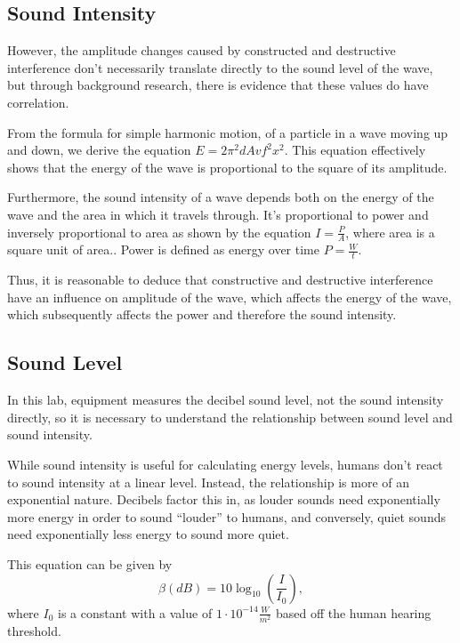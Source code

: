 \documentclass[index]{subfiles}
\begin{document}
\subsection{Sound Intensity}

However, the amplitude changes caused by constructed and destructive interference don't necessarily translate directly to the sound level of the wave, but through background research, there is evidence that these values do have correlation.

From the formula for simple harmonic motion, of a particle in a wave moving up and down, we derive the equation \(E=2\pi^2dAvf^2x^2\)\cite{giancoli1995physics}. This equation effectively shows that the energy of the wave is proportional to the square of its amplitude\cite{openstax}.

Furthermore, the sound intensity of a wave depends both on the energy of the wave and the area in which it travels through. It's proportional to power and inversely proportional to area as shown by the equation \(I=\frac{P}{A}\), where area is a square unit of area.\cite{openstax}. Power is defined as energy over time \(P=\frac{W}{t}\).

Thus, it is reasonable to deduce that constructive and destructive interference have an influence on amplitude of the wave, which affects the energy of the wave, which subsequently affects the power and therefore the sound intensity.

\subsection{Sound Level}

In this lab, equipment measures the decibel sound level, not the sound intensity directly, so it is necessary to understand the relationship between sound level and sound intensity.

While sound intensity is useful for calculating energy levels, humans don't react to sound intensity at a linear level. Instead, the relationship is more of an exponential nature. Decibels factor this in, as louder sounds need exponentially more energy in order to sound ``louder'' to humans, and conversely, quiet sounds need exponentially less energy to sound more quiet\cite{openstax}.

This equation can be given by
\[
    \beta\left(dB\right)=10\log_{10}\left(\frac{I}{I_{0}}\right)
    ,\] where \(I_{0}\) is a constant with a value of \(1\cdot10^{-14}\frac{W}{m^2}\) based off the human hearing threshold\cite{openstax}.
\end{document}
